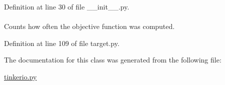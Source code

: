 \-Definition at line 30 of file \-\_\-\-\_\-init\-\_\-\-\_\-.\-py.

\hypertarget{classforcebalance_1_1target_1_1Target_ad4cd0ab38d8fc97d3e7a6e22ce130a16}{
\paragraph[{xct}]{}}\label{classforcebalance_1_1target_1_1Target_ad4cd0ab38d8fc97d3e7a6e22ce130a16}


\-Counts how often the objective function was computed. 



\-Definition at line 109 of file target.\-py.



\-The documentation for this class was generated from the following file\-:\begin{DoxyCompactItemize}
\item 
\hyperlink{tinkerio_8py}{tinkerio.\-py}\end{DoxyCompactItemize}
